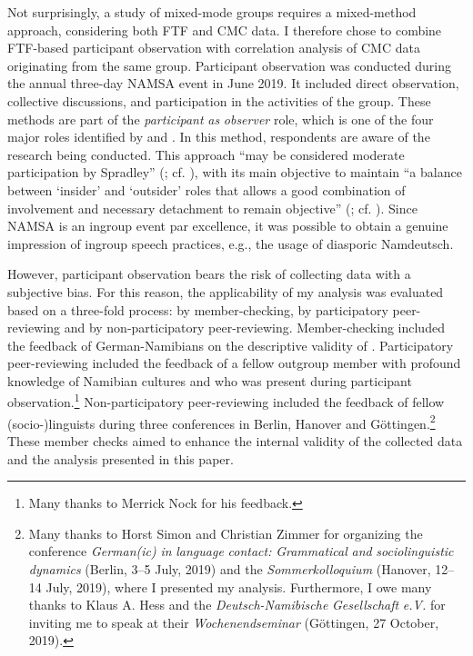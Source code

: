 \documentclass[output=paper]{langsci/langscibook}
\begin{document}
Not surprisingly, a study of mixed-mode groups requires a mixed-method approach, considering both FTF and CMC data. I therefore chose to combine FTF-based participant observation with correlation analysis of CMC data originating from the same group. Participant observation was conducted during the annual three-day NAMSA event in June 2019. It included direct observation, collective discussions, and participation in the activities of the group. These methods are part of the \textit{participant} \textit{as} \textit{observer} role, which is one of the four major roles identified by \citet{gold_roles_1958} and \citet{junker_field_1960}. In this method, respondents are aware of the research being conducted. This approach “may be considered moderate participation by Spradley” (\citealt[211]{howell_preparing_2018}; cf. \citealt[58]{spradley_participant_1980}), with its main objective to maintain “a balance between ‘insider’ and ‘outsider’ roles that allows a good combination of involvement and necessary detachment to remain objective” (\citealt[211]{howell_preparing_2018}; cf. \citealt[58]{spradley_participant_1980}). Since NAMSA is an ingroup event par excellence, it was possible to obtain a genuine impression of ingroup speech practices, e.g., the usage of diasporic Namdeutsch. 

However, participant observation bears the risk of collecting data with a subjective bias. For this reason, the applicability of my analysis was evaluated based on a three-fold process: by member-checking, by participatory peer-reviewing and by non-participatory peer-reviewing. Member-checking included the feedback of German-Namibians on the descriptive validity of . Participatory peer-reviewing included the feedback of a fellow outgroup member with profound knowledge of Namibian cultures and who was present during participant observation.\footnote{Many thanks to Merrick Nock for his feedback.} Non-participatory peer-reviewing included the feedback of fellow (socio\nobreakdash-)linguists during three conferences in Berlin, Hanover and Göttingen.\footnote{Many thanks to Horst Simon and Christian Zimmer for organizing the conference \textit{German(ic)} \textit{in} \textit{language} \textit{contact:} \textit{Grammatical} \textit{and} \textit{sociolinguistic} \textit{dynamics} (Berlin, 3--5 July, 2019) and the \textit{Sommerkolloquium} (Hanover, 12--14 July, 2019), where I presented my analysis. Furthermore, I owe many thanks to Klaus A. Hess and the \textit{Deutsch-Namibische} \textit{Gesellschaft} \textit{e.V.} for inviting me to speak at their \textit{Wochenendseminar} (Göttingen, 27 October, 2019).} These member checks aimed to enhance the internal validity of the collected data and the analysis presented in this paper.
\end{document}
